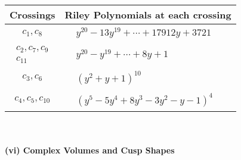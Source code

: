\documentclass[1p]{elsarticle_modified}
\theoremstyle{definition}
\begin{document}
\begin{tabular}{m{50pt}|m{274pt}}
Crossings & \hspace{64pt}Riley Polynomials at each crossing \\
\hline $$\begin{aligned}c_{1},c_{8}\end{aligned}$$&$\begin{aligned}
&y^{20}-13 y^{19}+\cdots+17912 y+3721
\end{aligned}$\\
\hline $$\begin{aligned}c_{2},c_{7},c_{9}\\c_{11}\end{aligned}$$&$\begin{aligned}
&y^{20}- y^{19}+\cdots+8 y+1
\end{aligned}$\\
\hline $$\begin{aligned}c_{3},c_{6}\end{aligned}$$&$\begin{aligned}
&(y^2+y+1)^{10}
\end{aligned}$\\
\hline $$\begin{aligned}c_{4},c_{5},c_{10}\end{aligned}$$&$\begin{aligned}
&(y^5-5 y^4+8 y^3-3 y^2- y-1)^4
\end{aligned}$\\
\hline
\end{tabular}\\~\\
\newpage\flushleft \textbf{(vi) Complex Volumes and Cusp Shapes}
\end{document}
